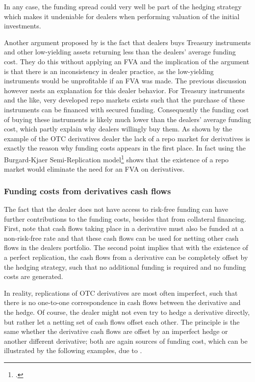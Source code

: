 \documentclass[../../../main.tex]{subfiles}
\begin{document}
        In any case,
        the funding spread could very well be part of the hedging strategy which makes it undeniable for dealers when performing valuation of the initial investments.

        Another argument proposed by \cite{HullWhite2012FVA} is the fact that dealers buys Treasury instruments and other low-yielding assets returning less than the dealers' average funding cost.
        They do this without applying an FVA and the implication of the argument is that there is an inconsistency in dealer practice,
        as the low-yielding instruments would be unprofitable if an FVA was made.
        The previous discussion however nests an explanation for this dealer behavior.
        For Treasury instruments and the like,
        very developed repo markets exists such that the purchase of these instruments can be financed with secured funding.
        Consequently the funding cost of buying these instruments is likely much lower than the dealers' average funding cost,
        which partly explain why dealers willingly buy them.
        As shown by the example of the OTC derivatives dealer the lack of a repo market for derivatives is exactly the reason why funding costs appears in the first place.
        In fact \cite[Section~9.4.1]{Green2015XVA} using the Burgard-Kjaer Semi-Replication model\footcite{BurgardKjaer2013Funding} shows that the existence of a repo market would eliminate the need for an FVA on derivatives. 
        
    \subsubsection{Funding costs from derivatives cash flows}
        The fact that the dealer does not have access to risk-free funding
        can have further contributions to the funding costs, besides that from collateral financing.
        First, note that cash flows taking place in a derivative must also be funded at a non-risk-free rate
        and that these cash flows can be used for netting other cash flows in the dealers portfolio.
        The second point implies that with the existence of a perfect replication,
        the cash flows from a derivative can be completely offset by the hedging strategy,
        such that no additional funding is required and no funding costs are generated.

        In reality, replications of OTC derivatives are most often imperfect,
        such that there is no one-to-one correspondence in cash flows between the derivative and the hedge.
        Of course, the dealer might not even try to hedge a derivative directly,
        but rather let a netting set of cash flows offset each other. 
        The principle is the same whether the derivative cash flows are offset by an imperfect hedge
        or another different derivative;
        both are again sources of funding cost, which can be illustrated by the following examples,
        due to \cite[Section~12.3]{Ruiz2015XVA}.
\end{document}
